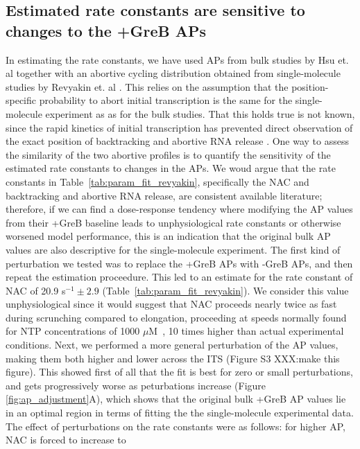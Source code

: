 \subsection{Estimated rate constants are sensitive to changes to the +GreB 
APs}
In estimating the rate constants, we have used APs from bulk studies by Hsu
et. al \cite{hsu_initial_2006} together with an abortive cycling distribution
obtained from single-molecule studies by Revyakin et. al
\cite{revyakin_abortive_2006}. This relies on the assumption that the
position-specific probability to abort initial transcription is the same for
the single-molecule experiment as as for the bulk studies. That this holds
true is not known, since the rapid kinetics of initial transcription
has prevented direct observation of the exact position of backtracking and abortive
RNA release \cite{margeat_direct_2006, revyakin_abortive_2006}. One way to
assess the similarity of the two abortive profiles is to quantify the
sensitivity of the estimated rate constants to changes in the APs. We woud
argue that the rate constants in Table~\ref{tab:param_fit_revyakin},
specifically the NAC and backtracking and abortive RNA release, are consistent
available literature; therefore, if we can find a dose-response tendency
where modifying the AP values from their +GreB baseline leads to
unphysiological rate constants or otherwise worsened model performance, this
is an indication that the original bulk AP values are also descriptive for the
single-molecule experiment. The first kind of perturbation we tested was to
replace the +GreB APs with -GreB APs, and then repeat the estimation
proceedure. This led to an estimate for the rate constant of NAC of 20.9
s$^{-1} \pm 2.9$ (Table~\ref{tab:param_fit_revyakin}). We consider this value
unphysiological since it would suggest that NAC proceeds nearly twice as fast during
scrunching compared to elongation, proceeding at speeds normally found for NTP
concentrations of 1000 $\mu$M~\cite{bai_mechanochemical_2007}, 10 times higher
than actual experimental conditions. Next, we performed a more general
perturbation of the AP values, making them both higher and lower across the
ITS (Figure S3 XXX:make this figure). This showed first of all that the fit is
best for zero or small perturbations, and gets progressively worse as
peturbations increase (Figure \ref{fig:ap_adjustment}A), which shows that the
original bulk +GreB AP values lie in an optimal region in terms of fitting the
the single-molecule experimental data. The effect of perturbations on the rate
constants were as follows: for higher AP, NAC is forced to increase to

